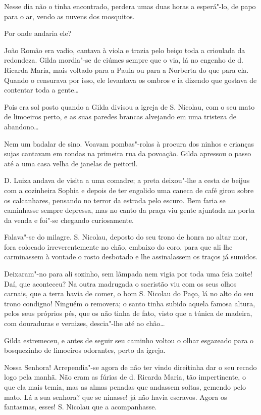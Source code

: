 Nesse dia não o tinha encontrado, perdera umas duas horas a esperá"-lo,
de papo para o ar, vendo as nuvens dos mosquitos.

Por onde andaria ele?

João Romão era vadio, cantava à viola e trazia pelo beiço toda a
crioulada da redondeza. Gilda mordia"-se de ciúmes sempre que o via, lá
no engenho de d. Ricarda Maria, mais voltado para a Paula ou para a
Norberta do que para ela. Quando o censurava por isso, ele levantava os
ombros e ia dizendo que gostava de contentar toda a gente\ldots{}

Pois era sol posto quando a Gilda divisou a igreja de S. Nicolau, com o
seu mato de limoeiros perto, e as suas paredes brancas alvejando em uma
tristeza de abandono\ldots{}

Nem um badalar de sino. Voavam pombas"-rolas à procura dos ninhos e
crianças sujas cantavam em rondas na primeira rua da povoação. Gilda
apressou o passo até a uma casa velha de janelas de peitoril.

D. Luiza andava de visita a uma comadre; a preta deixou"-lhe a cesta de
beijus com a cozinheira Sophia e depois de ter engolido uma caneca de
café girou sobre os calcanhares, pensando no terror da estrada pelo
escuro. Bem faria se caminhasse sempre depressa, mas no canto da praça
viu gente ajuntada na porta da venda e foi"-se chegando curiosamente.

Falava"-se do milagre. S. Nicolau, deposto do seu trono de honra no altar
mor, fora colocado irreverentemente no chão, embaixo do coro, para que
ali lhe carminassem à vontade o rosto desbotado e lhe assinalassem os
traços já sumidos.

Deixaram"-no para ali sozinho, sem lâmpada nem vigia por toda uma feia
noite! Daí, que aconteceu? Na outra madrugada o sacristão viu com os
seus olhos carnais, que a terra havia de comer, o bom S. Nicolau do
Paço, lá no alto do seu trono condigno! Ninguém o removera; o santo
tinha subido aquela famosa altura, pelos seus próprios pés, que os não
tinha de fato, visto que a túnica de madeira, com douraduras e vernizes,
descia"-lhe até ao chão\ldots{}

Gilda estremeceu, e antes de seguir seu caminho voltou o olhar esgazeado
para o bosquezinho de limoeiros odorantes, perto da igreja.

Nossa Senhora! Arrependia"-se agora de não ter vindo direitinha dar o seu
recado logo pela manhã. Não eram as fúrias de d. Ricarda Maria, tão
impertinente, o que ela mais temia, mas as almas penadas que andassem
soltas, gemendo pelo mato. Lá a sua senhora? que se ninasse! já não
havia escravos. Agora os fantasmas, esses! S. Nicolau que a
acompanhasse.


